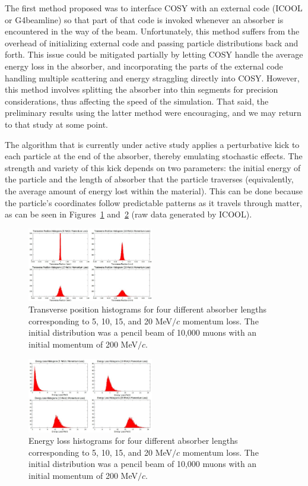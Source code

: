 \documentclass{jacow}
\begin{document}
The first method proposed was to interface COSY with an external code (ICOOL or G4beamline) so that part of that code is invoked whenever an absorber is encountered in the way of the beam. Unfortunately, this method suffers from the overhead of initializing external code and passing particle distributions back and forth. This issue could be mitigated partially by letting COSY handle the average energy loss in the absorber, and incorporating the parts of the external code handling multiple scattering and energy straggling directly into COSY. However, this method involves splitting the absorber into thin segments for precision considerations, thus affecting the speed of the simulation. That said, the preliminary results using the latter method were encouraging, and we may return to that study at some point.

The algorithm that is currently under active study applies a perturbative kick to each particle at the end of the absorber, thereby emulating stochastic effects. The strength and variety of this kick depends on two parameters: the initial energy of the particle and the length of absorber that the particle traverses (equivalently, the average amount of energy lost within the material). This can be done because the particle's coordinates follow predictable patterns as it travels through matter, as can be seen in Figures~\ref{fig:scattering} and~\ref{fig:straggling} (raw data generated by ICOOL).

\begin{figure}[htb]
\centering
\includegraphics[width=0.49\textwidth]{scattering.jpg}
\caption{Transverse position histograms for four different absorber lengths corresponding to 5, 10, 15, and 20 MeV$/c$ momentum loss. The initial distribution was a pencil beam of 10,000 muons with an initial momentum of 200 MeV$/c$.}
\label{fig:scattering}
\end{figure}

\begin{figure}[htb]
\centering
\includegraphics[width=0.49\textwidth]{straggling.jpg}
\caption{Energy loss histograms for four different absorber lengths corresponding to 5, 10, 15, and 20 MeV$/c$ momentum loss. The initial distribution was a pencil beam of 10,000 muons with an initial momentum of 200 MeV$/c$.}
\label{fig:straggling}
\end{figure}
\end{document}
